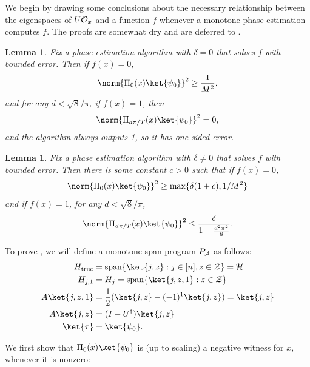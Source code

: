 \documentclass[11pt]{article}
\numberwithin{equation}{section}
\newtheorem{lemma}[theorem]{Lemma}
\theoremstyle{definition}
\theoremstyle{plain}
\begin{document}
We begin by drawing some conclusions about the necessary relationship between the eigenspaces of $U{\cal O}_x$ and a function $f$ whenever a monotone phase estimation computes $f$. The proofs are somewhat dry and are deferred to . %

\begin{lemma}\label{lem:phase-est-alg-delta-zero}
Fix a phase estimation algorithm with $\delta=0$ that solves $f$ with bounded error. Then if $f(x)=0$,
$$\norm{\Pi_0(x)\ket{\psi_0}}^2\geq \frac{1}{M^2},$$
and for any $d<\sqrt{8}/\pi$, if $f(x)=1$, then
$$\norm{\Pi_{d\pi/T}(x)\ket{\psi_0}}^2=0,$$
and the algorithm always outputs 1, so it has one-sided error.
\end{lemma}

\begin{lemma}\label{lem:phase-est-alg}
Fix a phase estimation algorithm with $\delta\neq 0$ that solves $f$ with bounded error. Then there is some constant $c>0$ such that if $f(x)=0$,
$$\norm{\Pi_0(x)\ket{\psi_0}}^2 \geq \max\{\delta(1+c),1/M^2\}$$
and if $f(x)=1$, for any $d<\sqrt{8}/\pi$, 
$$\norm{\Pi_{d\pi/T}(x)\ket{\psi_0}}^2 \leq \frac{\delta}{1-\frac{d^2\pi^2}{8}}.$$
\end{lemma}


To prove , we will define a monotone span program $P_{\cal A}$ as follows:
\begin{align}
H_{\mathrm{true}} &=\mathrm{span}\{\ket{j,z}:j\in [n],z\in{\cal Z}\}={\cal H}\nonumber\\
H_{j,1} &=H_j=\mathrm{span}\{\ket{j,z,1}:z\in{\cal Z}\}\nonumber\\
A\ket{j,z,1} &= \frac{1}{2}(\ket{j,z}-(-1)^1\ket{j,z}) = \ket{j,z}\nonumber\\
A\ket{j,z} &=(I-U^\dagger)\ket{j,z}\nonumber\\
\ket{\tau} &=\ket{\psi_0}.\label{eq:monotone-span}
\end{align}

We first show that $\Pi_0(x)\ket{\psi_0}$ is (up to scaling) a negative witness for $x$, whenever it is nonzero:
\end{document}
